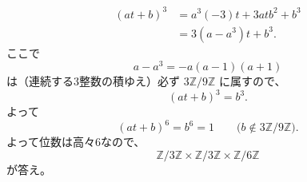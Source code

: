 \begin{enumerate}
  \begin{align*}
    (at+b)^3
      &=a^3(-3)t+3atb^2+b^3 \\
      &=3(a-a^3)t+b^3.
  \end{align*}
  ここで
  \[
    a-a^3=-a(a-1)(a+1)
  \]
  は（連続する3整数の積ゆえ）必ず $3\mathbb{Z}/9\mathbb{Z}$ に属すので、
  \[
    (at+b)^3=b^3.
  \]
  よって
  \[
    (at+b)^6=b^6=1
    \qquad\bigl(b\notin3\mathbb{Z}/9\mathbb{Z}\bigr).
  \]
  よって位数は高々6なので、
  \[
    \mathbb{Z}/3\mathbb{Z}\times\mathbb{Z}/3\mathbb{Z}\times\mathbb{Z}/6\mathbb{Z}
  \]
  が答え。
\end{enumerate}
